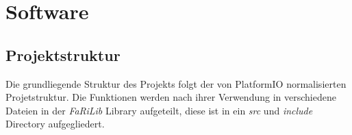 \chapter{Software}

    \section{Projektstruktur}
    Die grundliegende Struktur des Projekts folgt der von PlatformIO 
    normalisierten Projetstruktur. Die Funktionen werden nach ihrer
    Verwendung in verschiedene Dateien in der \textit{FaRiLib} Library
    aufgeteilt, diese ist in ein \textit{src} und \textit{include} 
    Directory aufgegliedert.

    
    



